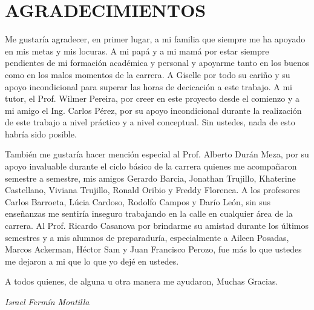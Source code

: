 \chapter*{AGRADECIMIENTOS}

Me gustaría agradecer, en primer lugar, a mi familia que siempre me ha apoyado en mis metas y mis locuras. A mi papá y a mi mamá por estar siempre pendientes de mi formación académica y personal y apoyarme tanto en los buenos como en los malos momentos de la carrera. A Giselle por todo su cariño y su apoyo incondicional para superar las horas de decicación a este trabajo. A mi tutor, el Prof. Wilmer Pereira, por creer en este proyecto desde el comienzo y a mi amigo el Ing. Carlos Pérez, por su apoyo incondicional durante la realización de este trabajo a nivel práctico y a nivel conceptual. Sin ustedes, nada de esto habría sido posible.

También me gustaría hacer mención especial al Prof. Alberto Durán Meza, por su apoyo invaluable durante el ciclo básico de la carrera quienes me acompañaron semestre a semestre, mis amigos Gerardo Barcia, Jonathan Trujillo, Khaterine Castellano, Viviana Trujillo, Ronald Oribio y Freddy Florenca. A los profesores Carlos Barroeta, Lúcia Cardoso, Rodolfo Campos y Darío León, sin sus enseñanzas me sentiría inseguro trabajando en la calle en cualquier área de la carrera. Al Prof. Ricardo Casanova por brindarme su amistad durante los últimos semestres y a mis alumnos de preparaduría, especialmente a Aileen Posadas, Marcos Ackerman, Héctor Sam y Juan Francisco Perozo, fue más lo que ustedes me dejaron a mi que lo que yo dejé en ustedes.

A todos quienes, de alguna u otra manera me ayudaron,
Muchas Gracias.


\begin{flushright}
\textit{Israel Fermín Montilla}
\end{flushright}
